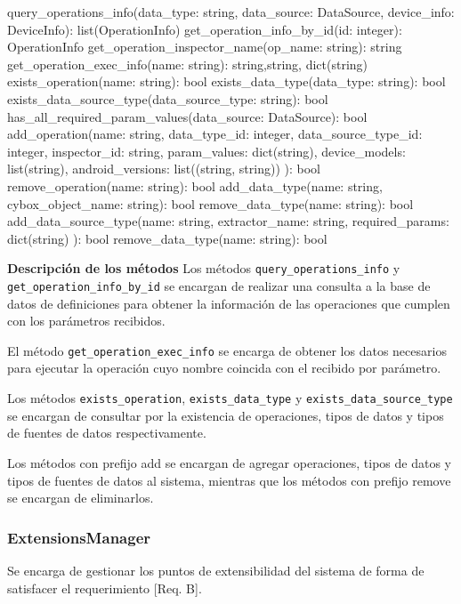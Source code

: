 \begin{python}[title=Interfaz DefinitionsDatabaseManager, captionpos=b]
query_operations_info(data_type: string, data_source: DataSource, 
                      device_info: DeviceInfo): list(OperationInfo)
get_operation_info_by_id(id: integer): OperationInfo
get_operation_inspector_name(op_name: string): string 
get_operation_exec_info(name: string): string,string, dict(string)
exists_operation(name: string): bool
exists_data_type(data_type: string): bool
exists_data_source_type(data_source_type: string): bool
has_all_required_param_values(data_source: DataSource): bool
add_operation(name: string, data_type_id: integer,
              data_source_type_id: integer,
              inspector_id: string,
              param_values: dict(string), 
              device_models: list(string),
              android_versions: list((string, string))
              ): bool
remove_operation(name: string): bool
add_data_type(name: string, cybox_object_name: string): bool
remove_data_type(name: string): bool
add_data_source_type(name: string,
                     extractor_name: string,
                     required_params: dict(string)
                     ): bool
remove_data_type(name: string): bool
\end{python}

\textbf{Descripción de los métodos} \newline
Los métodos \texttt{query\_operations\_info} y \texttt{get\_operation\_info\_by\_id} se encargan de realizar una consulta a la base de datos de definiciones para obtener la información de las operaciones que cumplen con los parámetros recibidos.

El método \texttt{get\_operation\_exec\_info} se encarga de obtener los datos necesarios para ejecutar la operación cuyo nombre coincida con el recibido por parámetro.

\begin{sloppypar} Los métodos \texttt{exists\_operation}, \texttt{exists\_data\_type} y \texttt{exists\-\_data\-\_source\-\_type} se encargan de consultar por la existencia de operaciones, tipos de datos y tipos de fuentes de datos respectivamente. \end{sloppypar}

Los métodos con prefijo add se encargan de agregar operaciones, tipos de datos y tipos de fuentes de datos al sistema, mientras que los métodos con prefijo remove se encargan de eliminarlos.
\newline

\subsubsection{ExtensionsManager}
Se encarga de gestionar los puntos de extensibilidad del sistema de forma de satisfacer el requerimiento [Req. B].
\newline

